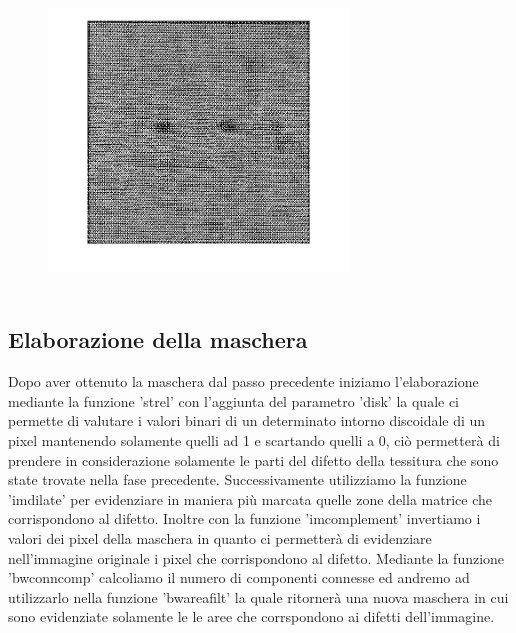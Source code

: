 \documentclass[a4paper]{article}
\begin{document}
    
    \begin{figure}[H]
        \centering
        \includegraphics[width=8cm,height=8cm,keepaspectratio]{graythreshold.jpg}
    \end{figure}
    
    
    \subsection{Elaborazione della maschera}
    
    \setlength{\baselineskip}{0.8cm}
    {\vspace{0.5cm}\fontsize{6mm}{6mm}\selectfont Dopo aver ottenuto la maschera dal passo precedente iniziamo l'elaborazione mediante la funzione 'strel' con l'aggiunta del parametro 'disk' la quale ci permette di valutare i valori binari di un determinato intorno discoidale di un pixel mantenendo solamente quelli ad 1 e scartando quelli a 0, ciò permetterà di prendere in considerazione solamente le parti del difetto della tessitura che sono state trovate nella fase precedente. Successivamente utilizziamo la funzione 'imdilate' per evidenziare in maniera più marcata quelle zone della matrice che corrispondono al difetto. Inoltre con la funzione 'imcomplement' invertiamo i valori dei pixel della maschera in quanto ci permetterà di evidenziare nell'immagine originale i pixel che corrispondono al difetto. Mediante la funzione 'bwconncomp' calcoliamo il numero di componenti connesse ed andremo ad utilizzarlo nella funzione 'bwareafilt' la quale ritornerà una nuova maschera in cui sono evidenziate solamente le le aree che corrspondono ai difetti dell'immagine.}
    
\end{document}
